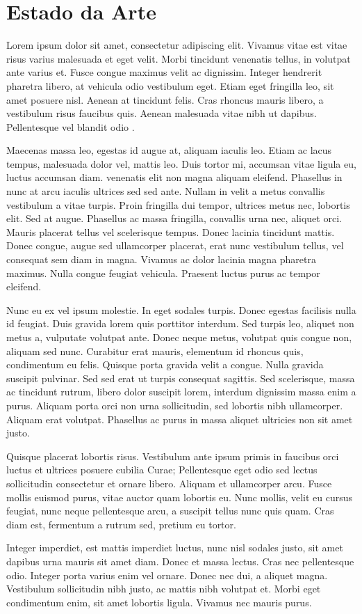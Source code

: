 \chapter{Estado da Arte}

Lorem ipsum dolor sit amet, consectetur adipiscing elit. Vivamus vitae est vitae risus varius malesuada et eget velit. Morbi tincidunt venenatis tellus, in volutpat ante varius et. Fusce congue maximus velit ac dignissim. Integer hendrerit pharetra libero, at vehicula odio vestibulum eget. Etiam eget fringilla leo, sit amet posuere nisl. Aenean at tincidunt felis. Cras rhoncus mauris libero, a vestibulum risus faucibus quis. Aenean malesuada vitae nibh ut dapibus. Pellentesque vel blandit odio \cite{barber2012bayesian}.

Maecenas massa leo, egestas id augue at, aliquam iaculis leo. Etiam ac lacus tempus, malesuada dolor vel, mattis leo. Duis tortor mi, accumsan vitae ligula eu, luctus accumsan diam.  venenatis elit non magna aliquam eleifend. Phasellus in nunc at arcu iaculis ultrices sed sed ante. Nullam in velit a metus convallis vestibulum a vitae turpis. Proin fringilla dui tempor, ultrices metus nec, lobortis elit. Sed at  augue. Phasellus ac massa fringilla, convallis urna nec, aliquet orci. Mauris placerat tellus vel scelerisque tempus. Donec lacinia tincidunt mattis. Donec congue, augue sed ullamcorper placerat, erat nunc vestibulum tellus, vel consequat sem diam in magna. Vivamus ac dolor lacinia magna pharetra maximus. Nulla congue feugiat vehicula. Praesent luctus purus ac  tempor eleifend.

Nunc eu ex vel ipsum  molestie. In eget sodales turpis. Donec egestas facilisis nulla id feugiat. Duis gravida lorem quis porttitor interdum. Sed turpis leo, aliquet non metus a, vulputate volutpat ante. Donec neque metus, volutpat quis congue non, aliquam sed nunc. Curabitur erat mauris, elementum id rhoncus quis, condimentum eu felis. Quisque porta gravida velit a congue. Nulla gravida suscipit pulvinar. Sed sed erat ut turpis consequat sagittis. Sed scelerisque, massa ac tincidunt rutrum, libero dolor suscipit lorem, interdum dignissim massa enim a purus. Aliquam porta orci non urna sollicitudin, sed lobortis nibh ullamcorper. Aliquam erat volutpat. Phasellus ac purus in massa aliquet ultricies non sit amet justo.

Quisque placerat lobortis risus. Vestibulum ante ipsum primis in faucibus orci luctus et ultrices posuere cubilia Curae; Pellentesque eget odio sed lectus sollicitudin consectetur et ornare libero. Aliquam et ullamcorper arcu. Fusce mollis euismod purus, vitae auctor quam lobortis eu. Nunc mollis, velit eu cursus feugiat, nunc neque pellentesque arcu, a suscipit tellus nunc quis quam. Cras diam est, fermentum a rutrum sed, pretium eu tortor.

Integer imperdiet, est mattis imperdiet luctus, nunc nisl sodales justo, sit amet dapibus urna mauris sit amet diam. Donec et massa lectus. Cras nec pellentesque odio. Integer porta varius enim vel ornare. Donec nec  dui, a aliquet magna. Vestibulum sollicitudin nibh justo, ac mattis nibh volutpat et. Morbi eget condimentum enim, sit amet lobortis ligula. Vivamus nec mauris purus.